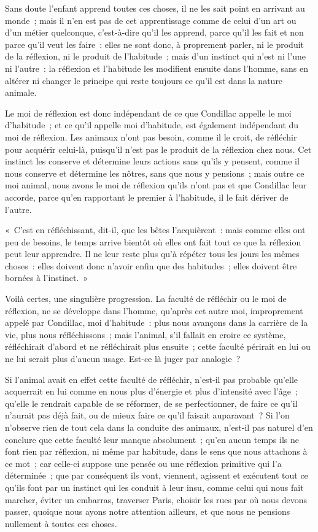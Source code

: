 \documentclass[french,twoside]{book} %
\begin{document}
Sans doute l’enfant apprend toutes ces choses, il ne les sait point en arrivant au monde ; mais il n’en est pas de cet apprentissage comme de celui d’un art ou d’un métier quelconque, c’est-à-dire qu’il les apprend, parce qu’il les fait et non parce qu’il veut les faire : elles ne sont donc, à proprement parler, ni le produit de la réflexion, ni le produit de l’habitude ; mais d’un instinct qui n’est ni l’une ni l’autre : la réflexion et l’habitude les modifient ensuite dans l’homme, sans en altérer ni changer le principe qui reste toujours ce qu’il est dans la nature animale.\par
Le moi de réflexion est donc indépendant de ce que Condillac appelle le moi d’habitude ; et ce qu’il appelle moi d’habitude, est également indépendant du moi de réflexion. Les animaux n’ont pas besoin, comme il le croit, de réfléchir pour acquérir celui-là, puisqu’il n’est pas le produit de la réflexion chez nous. Cet instinct les conserve et détermine leurs actions sans qu’ils y pensent, comme il nous conserve et détermine les nôtres, sans que nous y pensions ; mais outre ce moi animal, nous avons le moi de réflexion qu’ils n’ont pas et que Condillac leur accorde, parce qu’en rapportant le premier à l’habitude, il le fait dériver de l’autre.\par
« C’est en réfléchissant, dit-il, que les bêtes l’acquièrent : mais comme elles ont peu de besoins, le temps arrive bientôt où elles ont fait tout ce que la réflexion peut leur apprendre. Il ne leur reste plus qu’à répéter tous les jours les mêmes choses : elles doivent donc n’avoir enfin que des habitudes ; elles doivent être bornées à l’instinct. »\par
Voilà certes, une singulière progression. La faculté de réfléchir ou le moi de réflexion, ne se développe dans l’homme, qu’après cet autre moi, improprement appelé par Condillac, moi d’habitude : plus nous avançons dans la carrière de la vie, plus nous réfléchissons ; mais l’animal, s’il fallait en croire ce système, réfléchirait d’abord et ne réfléchirait plus ensuite ; cette faculté périrait en lui ou ne lui serait plus d’aucun usage. Est-ce là juger par analogie ?\par
Si l’animal avait en effet cette faculté de réfléchir, n’est-il pas probable qu’elle acquerrait en lui comme en nous plus d’énergie et plus d’intensité avec l’âge ; qu’elle le rendrait capable de se réformer, de se perfectionner, de faire ce qu’il n’aurait pas déjà fait, ou de mieux faire ce qu’il faisait auparavant ? Si l’on n’observe rien de tout cela dans la conduite des animaux, n’est-il pas naturel d’en conclure que cette faculté leur manque absolument ; qu’en aucun temps ils ne font rien par réflexion, ni même par habitude, dans le sens que nous attachons à ce mot ; car celle-ci suppose une pensée ou une réflexion primitive qui l’a déterminée ; que par conséquent ils vont, viennent, agissent et exécutent tout ce qu’ils font par un instinct qui les conduit à leur insu, comme celui qui nous fait marcher, éviter un embarras, traverser Paris, choisir les rues par où nous devons passer, quoique nous ayons notre attention ailleurs, et que nous ne pensions nullement à toutes ces choses.\par
\end{document}

